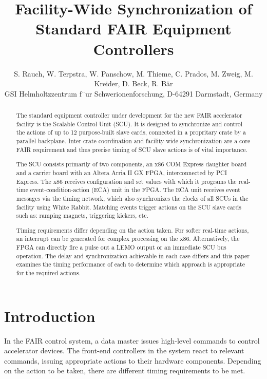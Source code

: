 \documentclass{JAC2003}
\begin{document}
\title{Facility-Wide Synchronization of Standard FAIR Equipment Controllers}

\author{
S. Rauch,
W. Terpstra,
W. Panschow,
M. Thieme,
C. Prados,
M. Zweig,
M. Kreider,
D. Beck,
R. B\"ar\\
GSI Helmholtzzentrum f¨ur Schwerionenforschung, D-64291 Darmstadt, Germany}

\maketitle

\begin{abstract}
The standard equipment controller under development for the new FAIR
accelerator facility is the Scalable Control Unit (SCU). It is designed to
synchronize and control the actions of up to 12 purpose-built slave cards,
connected in a propritary crate by a parallel backplane. Inter-crate
coordination and facility-wide synchronization are a core FAIR requirement
and thus precise timing of SCU slave actions is of vital importance.

The SCU consists primarily of two components, an x86 COM Express daughter
board and a carrier board with an Altera Arria II GX FPGA, interconnected by
PCI Express. The x86 receives configuration and set values with which it
programs the real-time event-condition-action (ECA) unit in the FPGA. The
ECA unit receives event messages via the timing network, which also
synchronizes the clocks of all SCUs in the facility using White Rabbit.
Matching events trigger actions on the SCU slave cards such as: ramping
magnets, triggering kickers, etc.

Timing requirements differ depending on the action taken. For softer
real-time actions, an interrupt can be generated for complex processing on
the x86. Alternatively, the FPGA can directly fire a pulse out a LEMO output
or an immediate SCU bus operation. The delay and synchronization achievable
in each case differs and this paper examines the timing performance of each
to determine which approach is appropriate for the required actions.
\end{abstract}

\section{Introduction}
In the FAIR control system,
a data master issues high-level commands to control accelerator devices.
The front-end controllers in the system react to relevant commands,
issuing appropriate actions to their hardware components.
Depending on the action to be taken,
there are different timing requirements to be met.
\end{document}
